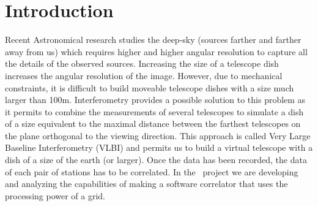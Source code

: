 \section{Introduction}
\begin{comment}
  Very Long Baseline Interferometry (VLBI) \cite{VLBIbook} is a type of
  interferometry used in radio astronomy, in which data received at
  several telescopes is combined to produce an image with very high
  resolution. VLBI can be used for both astronomy and geodesy.  For
  astronomy, VLBI provides high-resolution images of radio sources in
  the sky, whereas in geodesy VLBI measures the location of the
  telescopes and the Earth Orientation Parameters (EOP).
\end{comment}

Recent Astronomical research studies the deep-sky (sources farther and
farther away from us) which requires higher and higher angular
resolution to capture all the details of the observed sources.
Increasing the size of a telescope dish increases the angular
resolution of the image.  However, due to mechanical constraints, it
is difficult to build moveable telescope dishes with a size much
larger than 100m. Interferometry provides a possible solution to this
problem as it permits to combine the measurements of several
telescopes to simulate a dish of a size equivalent to the maximal
distance between the farthest telescopes on the plane orthogonal to
the viewing direction.  This approach is called Very Large Baseline
Interferometry (VLBI) and permits us to build a virtual telescope with
a dish of a size of the earth (or larger). Once the data has been
recorded, the data of each pair of stations has to be correlated.  In
the \scarie\ project we are developing and analyzing the capabilities
of making a software correlator that uses the processing power of a
grid.

